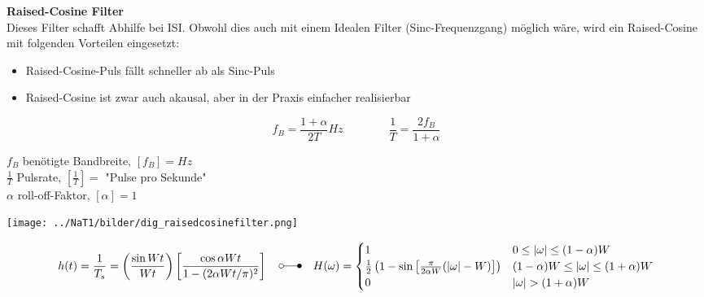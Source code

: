 \textbf{Raised-Cosine Filter } \\
Dieses Filter schafft Abhilfe bei ISI. Obwohl dies auch mit einem Idealen Filter
(Sinc-Frequenzgang) möglich wäre, wird ein Raised-Cosine mit folgenden Vorteilen eingesetzt:
\begin{itemize}
  \item Raised-Cosine-Puls fällt schneller ab als Sinc-Puls
  \item Raised-Cosine ist zwar auch akausal, aber in der Praxis einfacher realisierbar 
\end{itemize}

\begin{minipage}{9cm}
$$ f_B = \frac{1 + \alpha}{2 T} Hz \qquad \qquad \frac{1}{T} = \frac{2 f_B}{1 + \alpha}$$
\end{minipage}
\begin{minipage}{9cm}
	$f_B$ benötigte Bandbreite, $[f_B] = Hz$ \\
	$\frac{1}{T}$ Pulsrate, $[\frac{1}{T}] = $ "Pulse pro Sekunde" \\
	$\alpha$ roll-off-Faktor, $[\alpha] = 1$ 
\end{minipage}

\begin{center}  
		\texttt{[image: ../NaT1/bilder/dig\_raisedcosinefilter.png]}
\end{center}


$$ 
h(t) = \frac{1}{T_s} = \left( \frac{\sin{W t}}{W t} \right) \left[ \frac{\cos{\alpha W t}}{1
- (2 \alpha W t / \pi)^2}\right]
\quad \laplace \quad
H(\omega) = \begin{cases}
	1 			
		&  	0 \leq | \omega | \leq (1-\alpha) W       \\
	\frac{1}{2} \left( 1 - \sin\left[ \frac{\pi}{2 \alpha W} (| \omega | - W)\right] \right)      
		&	(1-\alpha) W \leq | \omega | \leq (1+\alpha) W       \\
	0
		& 	| \omega | > (1+\alpha) W
            \end{cases}
$$


% 

